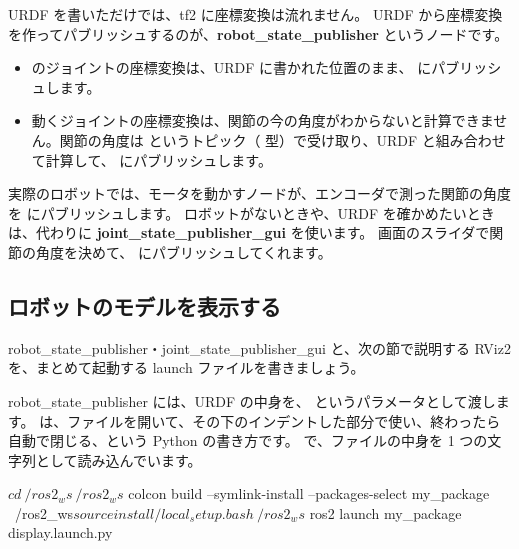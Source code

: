 URDF を書いただけでは、tf2 に座標変換は流れません。
URDF から座標変換を作ってパブリッシュするのが、\textbf{robot\_state\_publisher} というノードです。

\begin{itemize}
  \item {} のジョイントの座標変換は、URDF に書かれた位置のまま、 にパブリッシュします。
  \item 動くジョイントの座標変換は、関節の今の角度がわからないと計算できません。関節の角度は  というトピック（ 型）で受け取り、URDF と組み合わせて計算して、 にパブリッシュします。
\end{itemize}

実際のロボットでは、モータを動かすノードが、エンコーダで測った関節の角度を  にパブリッシュします。
ロボットがないときや、URDF を確かめたいときは、代わりに \textbf{joint\_state\_publisher\_gui} を使います。
画面のスライダで関節の角度を決めて、 にパブリッシュしてくれます。

\subsection{ロボットのモデルを表示する}

robot\_state\_publisher・joint\_state\_publisher\_gui と、次の節で説明する RViz2 を、まとめて起動する launch ファイルを書きましょう。



robot\_state\_publisher には、URDF の中身を、 というパラメータとして渡します。
 は、ファイルを開いて、その下のインデントした部分で使い、終わったら自動で閉じる、という Python の書き方です。
 で、ファイルの中身を 1 つの文字列として読み込んでいます。

\begin{terminal}[ロボットのモデルを表示する]
$ cd ~/ros2_ws
~/ros2_ws$ colcon build --symlink-install --packages-select my_package
~/ros2_ws$ source install/local_setup.bash
~/ros2_ws$ ros2 launch my_package display.launch.py
\end{terminal}

